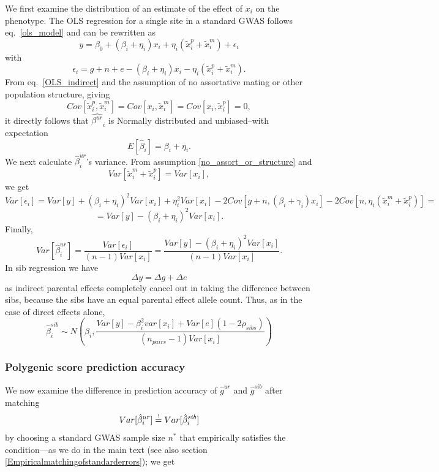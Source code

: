 \documentclass[hidelinks, 12pt]{article}
\begin{document}
We first examine the distribution of an estimate of the effect of $x_i$ on the phenotype.  The OLS regression for a single site in a standard GWAS follows eq.~\ref{ols_model} and can be rewritten as
\begin{equation}
\label{OLS_indirect}
y=\beta_0+(\beta_i+\eta_i)x_i+\eta_i(\tilde{x}_i^p+\tilde{x}_i^m)+\epsilon_i
\end{equation}
with
$$\epsilon_i=g+n+e-(\beta_i+\eta_i)x_i-\eta_i(\tilde{x}_i^p+\tilde{x}_i^m).$$
From eq.~\ref{OLS_indirect} and the assumption of no assortative mating or other population structure, giving 
\begin{equation}
\label{no_assort_or_structure}
Cov[\tilde{x}_i^p,\tilde{x}_i^m]=Cov[x_i,\tilde{x}_i^m]=Cov[x_i,\tilde{x}_i^p]=0,
\end{equation}
it directly follows that $\hat{\beta^{ur}}_i$ is Normally distributed and unbiased--with expectation 
$$E[\hat{\beta}_i]=\beta_i+\eta_i.$$
We next calculate $\hat{\beta}_i^{ur}$'s variance. From assumption \ref{no_assort_or_structure} and 
$$Var[\tilde{x}_i^m+\tilde{x}_i^p]=Var[x_i],$$
we get
$$Var[\epsilon_i]=Var[y]+(\beta_i+\eta_i)^2Var[x_i]+\eta_i^2Var[x_i]-2Cov[g+n,(\beta_i+\gamma_i)x_i]-2Cov[n,\eta_i(\tilde{x}_i^m+\tilde{x}_i^p)]=$$
$$=Var[y]-(\beta_i+\eta_i)^2Var[x_i].$$
Finally,
$$Var[\hat{\beta}_i^{ur}]=\frac{Var[\epsilon_i]}{(n-1)Var[x_i]}=\frac{Var[y]-(\beta_i+\eta_i)^2Var[x_i]}{(n-1)Var[x_i]}.$$
In sib regression we have
$$\Delta y=\Delta g+\Delta e$$
as indirect parental effects completely cancel out in taking the difference between sibs, because the sibs have an equal parental effect allele count. Thus, as in the case of direct effects alone, 
$$\hat{\beta}_i^{sib} \sim N(\beta_i,\frac{Var[y] - \beta_i^2var[x_i] + Var[e](1-2\rho_{sibs})}{(n_{pairs}-1) Var[x_i]})$$

\subsubsection{Polygenic score prediction accuracy}
We now examine the difference in prediction accuracy of $\hat{g}^{ur}$ and $\hat{g}^{sib}$ after matching 
\begin{equation}
\label{matching_errors_indirect}
Var[\hat{\beta}_i^{ur}] \reqeq Var[\hat{\beta}_i^{sib}]
\end{equation}
by choosing a standard GWAS sample size $n^*$ that empirically satisfies the condition---as we do in the main text (see also section \ref{Empiricalmatchingofstandarderrors}); we get
\end{document}
